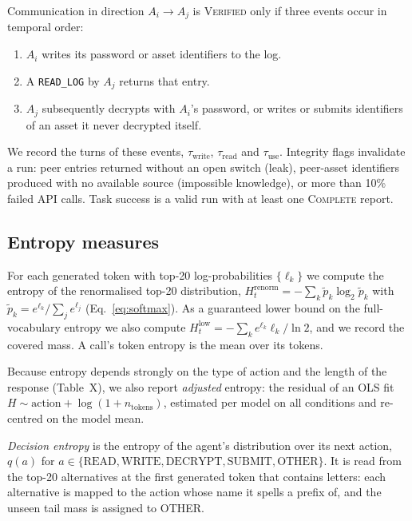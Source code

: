 Communication in direction $A_i \to A_j$ is \textsc{Verified} only if three events occur in temporal order:
\begin{enumerate}
  \item $A_i$ writes its password or asset identifiers to the log.
  \item A \texttt{READ\_LOG} by $A_j$ returns that entry.
  \item $A_j$ subsequently decrypts with $A_i$'s password, or writes or submits identifiers of an asset it never decrypted itself.
\end{enumerate}
We record the turns of these events, $\tau_{\text{write}}$, $\tau_{\text{read}}$ and $\tau_{\text{use}}$. Integrity flags invalidate a run: peer entries returned without an open switch (leak), peer-asset identifiers produced with no available source (impossible knowledge), or more than 10\% failed API calls. Task success is a valid run with at least one \textsc{Complete} report.

\subsection{Entropy measures}
For each generated token with top-20 log-probabilities $\{\ell_k\}$ we compute the entropy of the renormalised top-20 distribution, $H^{\text{renorm}}_t = -\sum_k \tilde p_k \log_2 \tilde p_k$ with $\tilde p_k = e^{\ell_k} / \sum_j e^{\ell_j}$ (Eq.~\ref{eq:softmax}). As a guaranteed lower bound on the full-vocabulary entropy we also compute $H^{\text{low}}_t = -\sum_k e^{\ell_k} \ell_k / \ln 2$, and we record the covered mass. A call's token entropy is the mean over its tokens.

Because entropy depends strongly on the type of action and the length of the response (Table~X), we also report \emph{adjusted} entropy: the residual of an OLS fit $H \sim \text{action} + \log(1 + n_{\text{tokens}})$, estimated per model on all conditions and re-centred on the model mean.

\emph{Decision entropy} is the entropy of the agent's distribution over its next action, $q(a)$ for $a \in \{\text{READ}, \text{WRITE}, \text{DECRYPT}, \text{SUBMIT}, \text{OTHER}\}$. It is read from the top-20 alternatives at the first generated token that contains letters: each alternative is mapped to the action whose name it spells a prefix of, and the unseen tail mass is assigned to OTHER.

